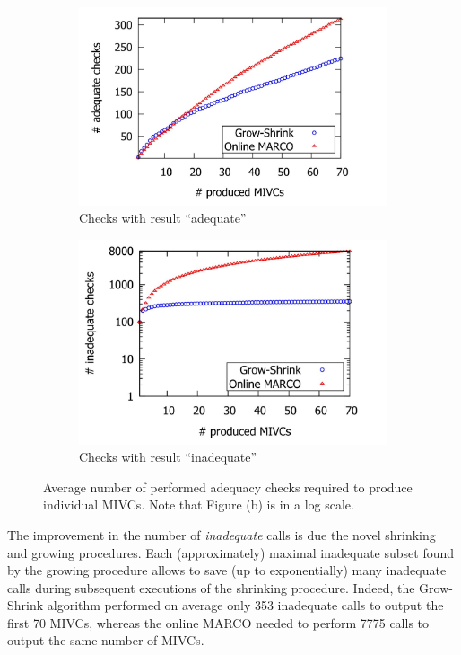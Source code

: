 \begin{figure}
\centering
\begin{subfigure}{\textwidth}
  \centering
  \includegraphics[scale=0.5]{./figs/adequate_checks_per_mivc_70.png}
  \caption{Checks with result ``adequate''}
  \label{res:adequate_checks}
\end{subfigure}\hfill
\begin{subfigure}{\textwidth}
  \centering
  \includegraphics[scale=0.5]{./figs/inadequate_checks_per_mivc_70.png}
  \caption{Checks with result ``inadequate''}
  \label{res:inadequate_checks}
\end{subfigure}
\caption{Average number of performed adequacy checks required to produce individual MIVCs. Note that Figure (b) is in a log scale.}
\label{res:checks}
\end{figure}

The improvement in the number of \emph{inadequate} calls is due the novel shrinking and growing procedures.
Each (approximately) maximal inadequate subset found by the growing procedure allows to save (up to exponentially) many inadequate calls during subsequent executions of the shrinking procedure.
Indeed, the Grow-Shrink algorithm performed on average only 353 inadequate calls to output the first 70 MIVCs, whereas the online MARCO needed to perform 7775 calls to output the same number of MIVCs.


